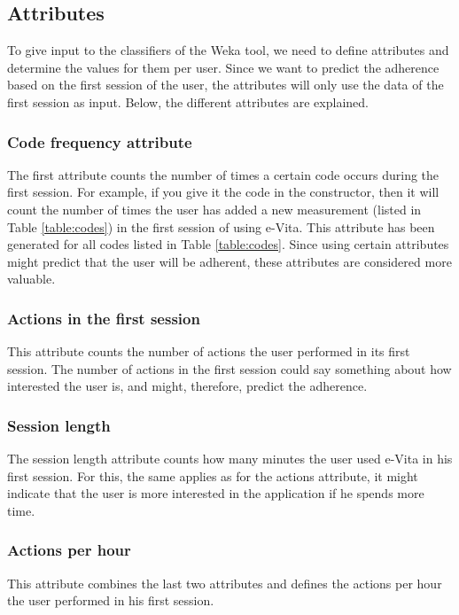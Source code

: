 \subsection{Attributes} \label{subsection:attributes}
To give input to the classifiers of the Weka tool, we need to define attributes and determine the values for them per user. Since we want to predict the adherence based on the first session of the user, the attributes will only use the data of the first session as input. Below, the different attributes are explained.

\subsubsection{Code frequency attribute}
The first attribute counts the number of times a certain code occurs during the first session. For example, if you give it the code  in the constructor, then it will count the number of times the user has added a new measurement (listed in Table \ref{table:codes}) in the first session of using e-Vita. This attribute has been generated for all codes listed in Table \ref{table:codes}. Since using certain attributes might predict that the user will be adherent, these attributes are considered more valuable.

\subsubsection{Actions in the first session}
This attribute counts the number of actions the user performed in its first session. The number of actions in the first session could say something about how interested the user is, and might, therefore, predict the adherence.

\subsubsection{Session length}
The session length attribute counts how many minutes the user used e-Vita in his first session. For this, the same applies as for the actions attribute, it might indicate that the user is more interested in the application if he spends more time.

\subsubsection{Actions per hour}
This attribute combines the last two attributes and defines the actions per hour the user performed in his first session.


